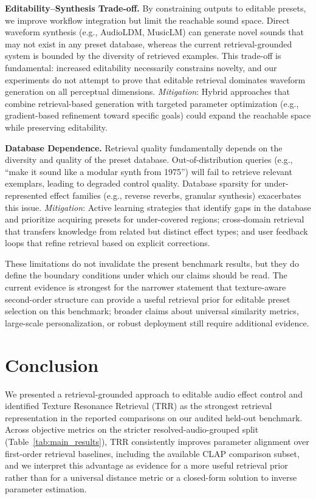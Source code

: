 \textbf{Editability--Synthesis Trade-off.} By constraining outputs to editable presets, we improve workflow integration but limit the reachable sound space. Direct waveform synthesis (e.g., AudioLDM, MusicLM) can generate novel sounds that may not exist in any preset database, whereas the current retrieval-grounded system is bounded by the diversity of retrieved examples. This trade-off is fundamental: increased editability necessarily constrains novelty, and our experiments do not attempt to prove that editable retrieval dominates waveform generation on all perceptual dimensions. \textit{Mitigation}: Hybrid approaches that combine retrieval-based generation with targeted parameter optimization (e.g., gradient-based refinement toward specific goals) could expand the reachable space while preserving editability.

\textbf{Database Dependence.} Retrieval quality fundamentally depends on the diversity and quality of the preset database. Out-of-distribution queries (e.g., ``make it sound like a modular synth from 1975'') will fail to retrieve relevant exemplars, leading to degraded control quality. Database sparsity for under-represented effect families (e.g., reverse reverbs, granular synthesis) exacerbates this issue. \textit{Mitigation}: Active learning strategies that identify gaps in the database and prioritize acquiring presets for under-covered regions; cross-domain retrieval that transfers knowledge from related but distinct effect types; and user feedback loops that refine retrieval based on explicit corrections.

These limitations do not invalidate the present benchmark results, but they do define the boundary conditions under which our claims should be read. The current evidence is strongest for the narrower statement that texture-aware second-order structure can provide a useful retrieval prior for editable preset selection on this benchmark; broader claims about universal similarity metrics, large-scale personalization, or robust deployment still require additional evidence.

\section{Conclusion}
\label{sec:conclusion}

We presented a retrieval-grounded approach to editable audio effect control and identified Texture Resonance Retrieval (TRR) as the strongest retrieval representation in the reported comparisons on our audited held-out benchmark. Across objective metrics on the stricter resolved-audio-grouped split (Table~\ref{tab:main_results}), TRR consistently improves parameter alignment over first-order retrieval baselines, including the available CLAP comparison subset, and we interpret this advantage as evidence for a more useful retrieval prior rather than for a universal distance metric or a closed-form solution to inverse parameter estimation.

